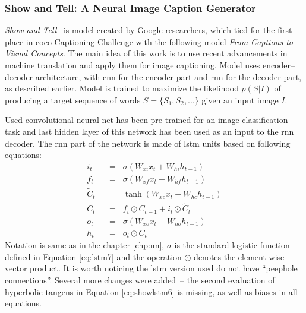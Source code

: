 \subsubsection{Show and Tell: A Neural Image Caption Generator} \label{subsubsec:showtell}

\emph{Show and Tell}~\cite{DBLP:journals/corr/VinyalsTBE14} is model created by Google researchers, which tied for the first place in \gls{coco} Captioning Challenge with the following model \emph{From Captions to Visual Concepts}. The main idea of this work is to use recent advancements in machine translation and apply them for image captioning. Model uses encoder--decoder architecture, with \gls{cnn} for the encoder part and \gls{rnn} for the decoder part, as described earlier. Model is trained to maximize the likelihood $ p(S|I) $ of producing a target sequence of words $ S = \{S_1,S_2,...\} $ given an input image $ I $.

Used convolutional neural net has been pre-trained for an image classification task and last hidden layer of this network has been used as an input to the \gls{rnn} decoder. The \gls{rnn} part of the network is made of \gls{lstm} units based on following equations:
\begin{align}
i_t \hspace{7pt}&=\hspace{7pt} \sigma(W_{xi}x_t + W_{hi}h_{t-1}) \label{eq:showlstm1}\\
f_t \hspace{7pt}&=\hspace{7pt} \sigma(W_{xf}x_t + W_{hf}h_{t-1}) \label{eq:showlstm2}\\
\widetilde{C}_t \hspace{7pt}&=\hspace{7pt} \tanh(W_{xc}x_t + W_{hc}h_{t-1}) \label{eq:showlstm3}\\
C_t \hspace{7pt}&=\hspace{7pt} f_t\odot C_{t-1} + i_t\odot \widetilde{C}_t \label{eq:showlstm4}\\
o_t \hspace{7pt}&=\hspace{7pt} \sigma(W_{xo}x_t + W_{ho}h_{t-1}) \label{eq:showlstm5}\\
h_t \hspace{7pt}&=\hspace{7pt} o_t\odot C_t \label{eq:showlstm6}
\end{align}
Notation is same as in the chapter \ref{chp:nn}, $ \sigma $ is the standard logistic function defined in Equation \eqref{eq:lstm7} and the operation $ \odot $ denotes the element-wise vector product. It is worth noticing the \gls{lstm} version used do not have \textquotedblleft peephole connections\textquotedblright. Several more changes were added~-- the second evaluation of hyperbolic tangens in Equation \eqref{eq:showlstm6} is missing, as well as biases in all equations.

